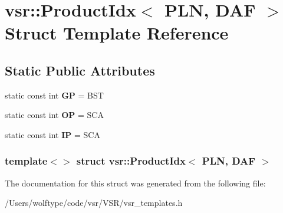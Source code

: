 \hypertarget{structvsr_1_1_product_idx_3_01_p_l_n_00_01_d_a_f_01_4}{\section{vsr\-:\-:Product\-Idx$<$ P\-L\-N, D\-A\-F $>$ Struct Template Reference}
\label{structvsr_1_1_product_idx_3_01_p_l_n_00_01_d_a_f_01_4}
}
\subsection*{Static Public Attributes}
\begin{DoxyCompactItemize}
\item 
\hypertarget{structvsr_1_1_product_idx_3_01_p_l_n_00_01_d_a_f_01_4_addd8b088f2a1d30d0c861d4301934315}{static const int {\bfseries G\-P} = B\-S\-T}\label{structvsr_1_1_product_idx_3_01_p_l_n_00_01_d_a_f_01_4_addd8b088f2a1d30d0c861d4301934315}

\item 
\hypertarget{structvsr_1_1_product_idx_3_01_p_l_n_00_01_d_a_f_01_4_a2654ada05e98063bd652066dc7bca2be}{static const int {\bfseries O\-P} = S\-C\-A}\label{structvsr_1_1_product_idx_3_01_p_l_n_00_01_d_a_f_01_4_a2654ada05e98063bd652066dc7bca2be}

\item 
\hypertarget{structvsr_1_1_product_idx_3_01_p_l_n_00_01_d_a_f_01_4_aead62712bbd3e6e6b05015f42fa29009}{static const int {\bfseries I\-P} = S\-C\-A}\label{structvsr_1_1_product_idx_3_01_p_l_n_00_01_d_a_f_01_4_aead62712bbd3e6e6b05015f42fa29009}

\end{DoxyCompactItemize}
\subsubsection*{template$<$$>$ struct vsr\-::\-Product\-Idx$<$ P\-L\-N, D\-A\-F $>$}



The documentation for this struct was generated from the following file\-:\begin{DoxyCompactItemize}
\item 
/\-Users/wolftype/code/vsr/\-V\-S\-R/vsr\-\_\-templates.\-h\end{DoxyCompactItemize}
